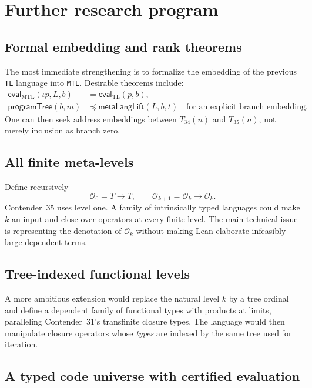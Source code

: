 \documentclass[11pt]{article}
\theoremstyle{definition}
\newcommand{\Op}{\mathcal{O}}
\newcommand{\code}[1]{\texttt{#1}}
\begin{document}
\section{Further research program}

\subsection{Formal embedding and rank theorems}

The most immediate strengthening is to formalize the embedding of the previous
\code{TL} language into \code{MTL}.  Desirable theorems include:
\begin{align*}
  \mathsf{eval}_{\mathrm{MTL}}(\iota p,L,b)
    &= \mathsf{eval}_{\mathrm{TL}}(p,b),\\
  \mathsf{programTree}(b,m)
    &\preccurlyeq \mathsf{metaLangLift}(L,b,t)
    \quad\text{for an explicit branch embedding.}
\end{align*}
One can then seek address embeddings between \(T_{34}(n)\) and
\(T_{35}(n)\), not merely inclusion as branch zero.

\subsection{All finite meta-levels}

Define recursively
\[
  \Op_0=T\to T,
  \qquad
  \Op_{k+1}=\Op_k\to\Op_k.
\]
Contender~35 uses level one.  A family of intrinsically typed languages could
make \(k\) an input and close over operators at every finite level.  The main
technical issue is representing the denotation of \(\Op_k\) without making
Lean elaborate infeasibly large dependent terms.

\subsection{Tree-indexed functional levels}

A more ambitious extension would replace the natural level \(k\) by a tree
ordinal and define a dependent family of functional types with products at
limits, paralleling Contender~31's transfinite closure types.  The language
would then manipulate closure operators whose \emph{types} are indexed by the
same tree used for iteration.

\subsection{A typed code universe with certified evaluation}
\end{document}
